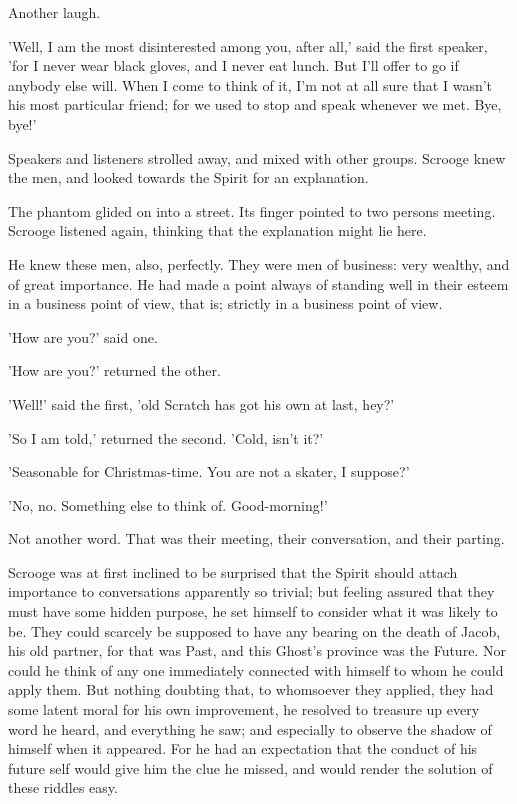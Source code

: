 Another laugh.

'Well, I am the most disinterested among you, after all,' said the first
speaker, 'for I never wear black gloves, and I never eat lunch. But I'll
offer to go if anybody else will. When I come to think of it, I'm not
at all sure that I wasn't his most particular friend; for we used to
stop and speak whenever we met. Bye, bye!'

Speakers and listeners strolled away, and mixed with other groups.
Scrooge knew the men, and looked towards the Spirit for an explanation.

The phantom glided on into a street. Its finger pointed to two persons
meeting. Scrooge listened again, thinking that the explanation might lie
here.

He knew these men, also, perfectly. They were men of business: very
wealthy, and of great importance. He had made a point always of standing
well in their esteem in a business point of view, that is; strictly in a
business point of view.

'How are you?' said one.

'How are you?' returned the other.

'Well!' said the first, 'old Scratch has got his own at last, hey?'

'So I am told,' returned the second. 'Cold, isn't it?'

'Seasonable for Christmas-time. You are not a skater, I suppose?'

'No, no. Something else to think of. Good-morning!'

Not another word. That was their meeting, their conversation, and their
parting.

Scrooge was at first inclined to be surprised that the Spirit should
attach importance to conversations apparently so trivial; but feeling
assured that they must have some hidden purpose, he set himself to
consider what it was likely to be. They could scarcely be supposed to
have any bearing on the death of Jacob, his old partner, for that was
Past, and this Ghost's province was the Future. Nor could he think of
any one immediately connected with himself to whom he could apply them.
But nothing doubting that, to whomsoever they applied, they had some
latent moral for his own improvement, he resolved to treasure up every
word he heard, and everything he saw; and especially to observe the
shadow of himself when it appeared. For he had an expectation that the
conduct of his future self would give him the clue he missed, and would
render the solution of these riddles easy.

